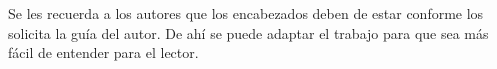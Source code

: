     
    
    
    Se les recuerda a los autores que los encabezados deben de estar conforme los solicita la guía del autor. De ahí se puede adaptar el trabajo para que sea más fácil de entender para el lector.
    
    
    
    
    
    
